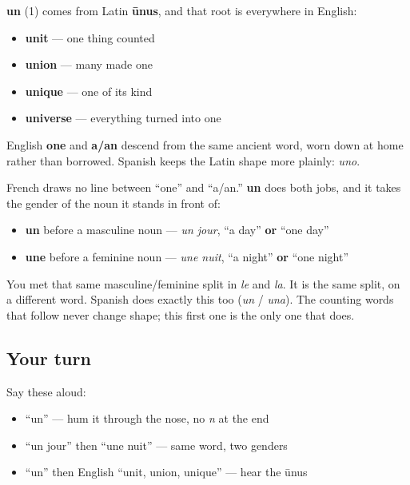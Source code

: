 \begin{cousinweb}
\textbf{un} (1) comes from Latin \textbf{ūnus}, and that root is everywhere in English:

\begin{itemize}
\raggedright
  \item \textbf{unit} — one thing counted
  \item \textbf{union} — many made one
  \item \textbf{unique} — one of its kind
  \item \textbf{universe} — everything turned into one
\end{itemize}

English \textbf{one} and \textbf{a/an} descend from the same ancient word, worn down at home rather than borrowed. Spanish keeps the Latin shape more plainly: \emph{uno}.
\end{cousinweb}

\begin{grammarlens}[title={Grammar Lens: one word for \textquotedblleft{}one\textquotedblright{} and \textquotedblleft{}a\textquotedblright{}}]
French draws no line between \textquotedblleft{}one\textquotedblright{} and \textquotedblleft{}a/an.\textquotedblright{} \textbf{un} does both jobs, and it takes the gender of the noun it stands in front of:

\begin{itemize}
\raggedright
  \item \textbf{un} before a masculine noun — \emph{un jour}, \textquotedblleft{}a day\textquotedblright{} \textbf{or} \textquotedblleft{}one day\textquotedblright{}
  \item \textbf{une} before a feminine noun — \emph{une nuit}, \textquotedblleft{}a night\textquotedblright{} \textbf{or} \textquotedblleft{}one night\textquotedblright{}
\end{itemize}

You met that same masculine/feminine split in \emph{le} and \emph{la}. It is the same split, on a different word. Spanish does exactly this too (\emph{un} / \emph{una}). The counting words that follow never change shape; this first one is the only one that does.
\end{grammarlens}

\subsection*{Your turn}
Say these aloud:

\begin{itemize}
\raggedright
  \item \textquotedblleft{}un\textquotedblright{} — hum it through the nose, no \emph{n} at the end
  \item \textquotedblleft{}un jour\textquotedblright{} then \textquotedblleft{}une nuit\textquotedblright{} — same word, two genders
  \item \textquotedblleft{}un\textquotedblright{} then English \textquotedblleft{}unit, union, unique\textquotedblright{} — hear the ūnus
\end{itemize}

